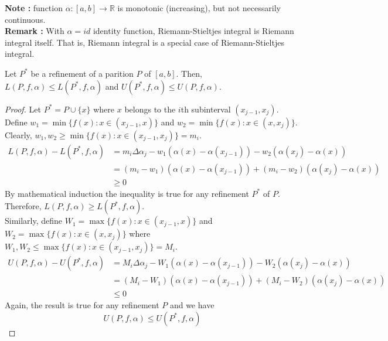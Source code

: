 \textbf{Note : } function $\alpha : [a,b] \to \mathbb{R}$ is monotonic (increasing), but not necessarily continuous.\\

\textbf{Remark : } With $\alpha = id$ identity function, Riemann-Stieltjes integral is Riemann integral itself.
	That is, Riemann integral is a special case of Riemann-Stieltjes integral.

\begin{theorem}
	Let $P^\ast$ be a refinement of a parition $P$ of $[a,b]$.
	Then, $L(P,f,\alpha) \le L(P^\ast,f,\alpha)$ and $U(P^\ast,f,\alpha) \le U(P,f,\alpha)$.
\end{theorem}
\begin{proof}
	Let $P^\ast = P \cup \{ x \}$ where $x$ belongs to the $i$th subinterval $(x_{j-1},x_j)$.
	Define $w_1 = \min \{ f(x) : x \in (x_{j-1},x) \}$ and $w_2 = \min \{ f(x) : x \in (x,x_j) \}$.
	Clearly, $w_1,w_2 \ge \min \{ f(x) : x \in (x_{j-1},x_j) \} = m_i$.
	\begin{align*}
	L(P,f,\alpha) - L(P^\ast,f,\alpha) 
		& = m_i \Delta \alpha_j - w_1 (\alpha(x)-\alpha(x_{j-1})) - w_2 (\alpha(x_j) - \alpha(x)) \\
		& = (m_i - w_1)(\alpha(x)-\alpha(x_{j-1})) + (m_i - w_2)(\alpha(x_j)-\alpha(x))\\
		& \ge 0
	\end{align*}
	By mathematical induction the inequality is true for any refinement $P^\ast$ of $P$.
	Therefore, $L(P,f,\alpha) \ge L(P^\ast,f,\alpha)$.\\

	Similarly, define $W_1 = \max \{f(x) : x \in (x_{j-1},x) \}$ and $W_2 = \max \{ f(x) : x \in (x,x_j) \}$
	where $W_1,W_2 \le \max \{ f(x) : x \in (x_{j-1},x_j) \} = M_i$.
	\begin{align*}
	U(P,f,\alpha) - U(P^\ast,f,\alpha) 
		& = M_i \Delta \alpha_j - W_1 (\alpha(x)-\alpha(x_{j-1})) - W_2 (\alpha(x_j) - \alpha(x)) \\
		& = (M_i - W_1)(\alpha(x)-\alpha(x_{j-1})) + (M_i - W_2)(\alpha(x_j)-\alpha(x))\\
		& \le 0
	\end{align*}
	Again, the result is true for any refinement $P$ and we have
	\[ U(P,f,\alpha) \le U(P^\ast,f,\alpha) \]
\end{proof}

